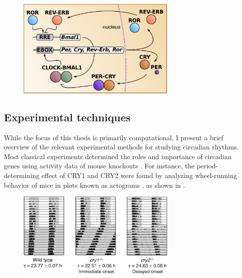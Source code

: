 \begin{figure}[tbp]
  \centering
  \includegraphics[width=0.7\textwidth]{chap1/figures/coreloop.pdf}
  \label{fig:coreloop}
\end{figure}

\subsection{Experimental techniques}

While the focus of this thesis is primarily computational, I present a brief overview of the relevant experimental methods for studying circadian rhythms.
Most classical experiments determined the roles and importance of circadian genes using activity data of mouse knockouts \cite{Vitaterna1994}.
For instance, the period-determining effect of CRY1 and CRY2 were found by analyzing wheel-running behavior of mice in plots known as actograms \cite{VanderHorst1999}, as shown in .

\begin{figure}[tbp]
  \centering
  \includegraphics[width=0.7\textwidth]{chap1/figures/vanderhorst.png}
  \label{fig:vanderhorst}
\end{figure}

